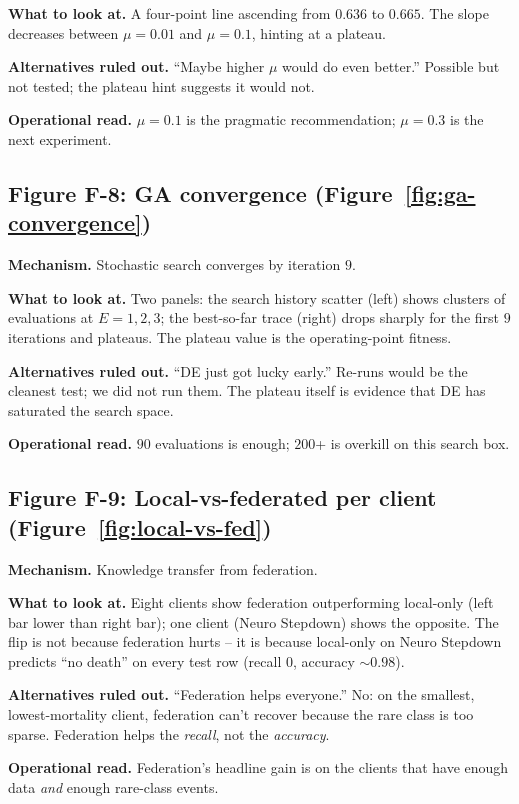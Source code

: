 \textbf{What to look at.} A four-point line ascending from
$0.636$ to $0.665$. The slope decreases between $\mu\!=\!0.01$ and
$\mu\!=\!0.1$, hinting at a plateau.

\textbf{Alternatives ruled out.} ``Maybe higher $\mu$ would do
even better.'' Possible but not tested; the plateau hint suggests
it would not.

\textbf{Operational read.} $\mu\!=\!0.1$ is the pragmatic
recommendation; $\mu\!=\!0.3$ is the next experiment.

\subsection{Figure F-8: GA convergence
(Figure~\ref{fig:ga-convergence})}
\textbf{Mechanism.} Stochastic search converges by iteration $9$.

\textbf{What to look at.} Two panels: the search history scatter
(left) shows clusters of evaluations at $E\!=\!1, 2, 3$; the
best-so-far trace (right) drops sharply for the first $9$
iterations and plateaus. The plateau value is the operating-point
fitness.

\textbf{Alternatives ruled out.} ``DE just got lucky early.''
Re-runs would be the cleanest test; we did not run them. The
plateau itself is evidence that DE has saturated the search space.

\textbf{Operational read.} $90$ evaluations is enough; $200$+ is
overkill on this search box.

\subsection{Figure F-9: Local-vs-federated per client
(Figure~\ref{fig:local-vs-fed})}
\textbf{Mechanism.} Knowledge transfer from federation.

\textbf{What to look at.} Eight clients show federation outperforming
local-only (left bar lower than right bar); one client (Neuro
Stepdown) shows the opposite. The flip is not because federation
hurts -- it is because local-only on Neuro Stepdown predicts
``no death'' on every test row (recall $0$, accuracy $\sim$$0.98$).

\textbf{Alternatives ruled out.} ``Federation helps everyone.'' No:
on the smallest, lowest-mortality client, federation can't recover
because the rare class is too sparse. Federation helps the
\emph{recall}, not the \emph{accuracy}.

\textbf{Operational read.} Federation's headline gain is on the
clients that have enough data \emph{and} enough rare-class events.

